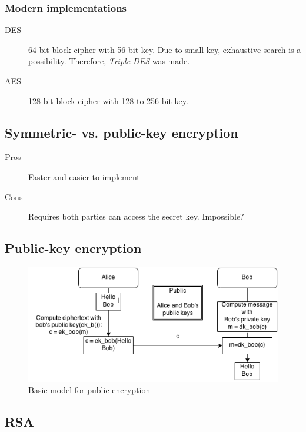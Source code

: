 \subsubsection*{Modern implementations}
\begin{description}
\item[DES] 64-bit block cipher with 56-bit key. Due to small key,
  exhaustive search is a possibility. Therefore, \emph{Triple-DES} was
  made.
\item[AES] 128-bit block cipher with 128 to 256-bit key.
\end{description}

\subsection{Symmetric- vs. public-key encryption}
\begin{description}
\item[Pros] Faster and easier to implement
\item[Cons] Requires both parties can access the secret key. Impossible?
\end{description}

\subsection{Public-key encryption}
\begin{figure}[H]
  \begin{centering}
    \includegraphics[width=15cm]{images/1-pub-enc}
    \caption{Basic model for public encryption}
  \end{centering}
  \label{fig:pub-enc}
\end{figure}
\subsection{RSA}

